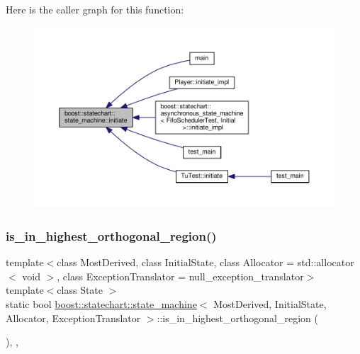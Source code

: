 Here is the caller graph for this function\+:
\nopagebreak
\begin{figure}[H]
\begin{center}
\leavevmode
\includegraphics[width=350pt]{classboost_1_1statechart_1_1state__machine_a7165ce3d1120b98dde6e8d669e35aba9_icgraph}
\end{center}
\end{figure}
\mbox{\label{classboost_1_1statechart_1_1state__machine_ad61cc29a03b3adfe91a1ae83864c5229}} 
\subsubsection{\texorpdfstring{is\+\_\+in\+\_\+highest\+\_\+orthogonal\+\_\+region()}{is\_in\_highest\_orthogonal\_region()}}
{\footnotesize\ttfamily template$<$class Most\+Derived, class Initial\+State, class Allocator = std\+::allocator$<$ void $>$, class Exception\+Translator = null\+\_\+exception\+\_\+translator$>$ \\
template$<$class State $>$ \\
static bool \mbox{\hyperlink{classboost_1_1statechart_1_1state__machine}{boost\+::statechart\+::state\+\_\+machine}}$<$ Most\+Derived, Initial\+State, Allocator, Exception\+Translator $>$\+::is\+\_\+in\+\_\+highest\+\_\+orthogonal\+\_\+region (\begin{DoxyParamCaption}{ }\end{DoxyParamCaption})\hspace{0.3cm}{\ttfamily [inline]}, {\ttfamily [static]}, {\ttfamily [private]}}

